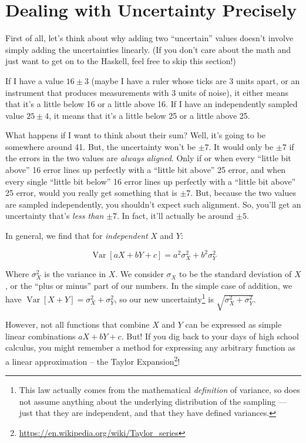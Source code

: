 \documentclass[]{article}
\renewcommand{\href}[2]{#2\footnote{\url{#1}}}
\begin{document}
\hypertarget{dealing-with-uncertainty-precisely}{%
\section{Dealing with Uncertainty
Precisely}\label{dealing-with-uncertainty-precisely}}

First of all, let's think about why adding two ``uncertain'' values doesn't
involve simply adding the uncertainties linearly. (If you don't care about the
math and just want to get on to the Haskell, feel free to skip this section!)

If I have a value \(16 \pm 3\) (maybe I have a ruler whose ticks are 3 units
apart, or an instrument that produces measurements with 3 units of noise), it
either means that it's a little below 16 or a little above 16. If I have an
independently sampled value \(25 \pm 4\), it means that it's a little below 25
or a little above 25.

What happens if I want to think about their sum? Well, it's going to be
somewhere around 41. But, the uncertainty won't be \(\pm 7\). It would only be
\(\pm 7\) if the errors in the two values are \emph{always aligned}. Only if or
when every ``little bit above'' 16 error lines up perfectly with a ``little bit
above'' 25 error, and when every single ``little bit below'' 16 error lines up
perfectly with a ``little bit above'' 25 error, would you really get something
that is \(\pm 7\). But, because the two values are sampled independently, you
shouldn't expect such alignment. So, you'll get an uncertainty that's \emph{less
than} \(\pm 7\). In fact, it'll actually be around \(\pm 5\).

In general, we find that for \emph{independent} \(X\) and \(Y\):

\[
\operatorname{Var}[aX + bY + c] = a^2 \sigma_X^2 + b^2 \sigma_Y^2
\]

Where \(\sigma_X^2\) is the variance in \(X\). We consider \(\sigma_X\) to be
the standard deviation of \(X\), or the ``plus or minus'' part of our numbers.
In the simple case of addition, we have
\(\operatorname{Var}[X + Y] = \sigma_X^2 + \sigma_Y^2\), so our new
uncertainty\footnote{This law actually comes from the mathematical
  \emph{definition} of variance, so does not assume anything about the
  underlying distribution of the sampling --- just that they are independent,
  and that they have defined variances.} is \(\sqrt{\sigma_X^2 + \sigma_Y^2}\).

However, not all functions that combine \(X\) and \(Y\) can be expressed as
simple linear combinations \(aX + bY + c\). But! If you dig back to your days of
high school calculus, you might remember a method for expressing any arbitrary
function as a linear approximation -- the
\href{https://en.wikipedia.org/wiki/Taylor_series}{Taylor Expansion}!
\end{document}
